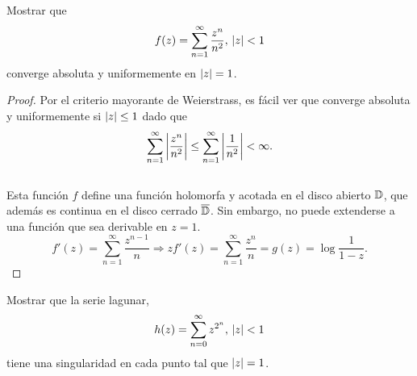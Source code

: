 
\begin{example}
    Mostrar que
    \begin{equation*}
        f(z) = \sum_{n=1}^{\infty} \frac{z^n}{n^2}, \, \left\lvert z\right\rvert < 1
    \end{equation*}
    converge absoluta y uniformemente en $\left\lvert z\right\rvert = 1$.
\end{example}

\begin{proof}
    Por el criterio mayorante de Weierstrass, es fácil ver que converge absoluta y uniformemente si $\left\lvert z\right\rvert \leq 1$ dado que
    \begin{equation*}
        \sum_{n=1}^{\infty} \left\lvert\frac{z^n}{n^2}\right\rvert \leq \sum_{n=1}^{\infty} \left\lvert\frac{1}{n^2}\right\rvert < \infty.
    \end{equation*}
    \\
    Esta función $f$ define una función holomorfa y acotada en el disco abierto $\mathbb{D}$, que además es continua en el disco cerrado $\overline{\mathbb{D}}$. Sin embargo, no puede extenderse a una función que sea derivable en $z = 1$. \\
    \begin{equation*}
        f'(z) =  \sum_{n=1}^{\infty} \frac{z^{n-1}}{n} \Rightarrow zf'(z) = \sum_{n=1}^{\infty} \frac{z^{n}}{n} = g(z) = \log{\frac{1}{1 - z}}.
    \end{equation*}

    \begin{comment}
    \begin{equation*}
        f''(z) =  \sum_{n=2}^{\infty} \frac{(n - 1)}{n} z^{n-2} =  \sum_{n=2}^{\infty} z^{n-2} - \sum_{n=2}^{\infty} \frac{1}{n} z^{n-2}
    \end{equation*}
     \begin{equation*}
         \sum_{n=2}^{\infty} z^{n-2} = \sum_{n=0}^{\infty} z^{n} = \frac{1}{1 - z}.
    \end{equation*}
    \end{comment}
 \end{proof}


\begin{example}
    Mostrar que la serie lagunar,
    \begin{equation*}
        h(z) = \sum_{n=0}^{\infty}  z^{2^n}, \, \left\lvert z\right\rvert < 1
    \end{equation*}
 tiene una singularidad en cada punto tal que $\left\lvert z\right\rvert = 1$.
\end{example}

